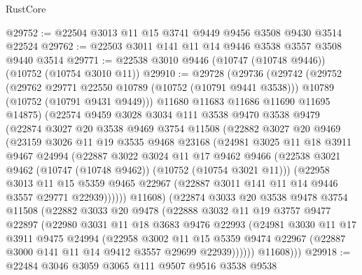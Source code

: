 \begin{lexlean}{RustCore}
\begin{coremodule}
@29752 := @22504 @3013 @11 @15 @3741 @9449 @9456 @3508 @9430 @3514 @22524
@29762 := @22503 @3011 @141 @11 @14 @9446 @3538 @3557 @3508 @9440 @3514
@29771 := @22538 @3010 @9446 (@10747 (@10748 @9446)) (@10752 (@10754 @3010 @11))
@29910 := @29728
    (@29736
      (@29742
        (@29752
          (@29762 @29771 @22550 @10789 (@10752 (@10791 @9441 @3538)))
          @10789
          (@10752 (@10791 @9431 @9449)))
        @11680
        @11683
        @11686
        @11690
        @11695
        @14875)
      (@22574
        @9459
        @3028
        @3034
        @111
        @3538
        @9470
        @3538
        @9479
        (@22874
          @3027
          @20
          @3538
          @9469
          @3754
          @11508
          (@22882
            @3027
            @20
            @9469
            (@23159
              @3026
              @11
              @19
              @3535
              @9468
              @23168
              (@24981
                @3025
                @11
                @18
                @3911
                @9467
                @24994
                (@22887
                  @3022
                  @3024
                  @11
                  @17
                  @9462
                  @9466
                  (@22538 @3021 @9462 (@10747 (@10748 @9462)) (@10752 (@10754 @3021 @11)))
                  (@22958
                    @3013
                    @11
                    @15
                    @5359
                    @9465
                    @22967
                    (@22887 @3011 @141 @11 @14 @9446 @3557 @29771 @22939))))))
          @11608)
        (@22874
          @3033
          @20
          @3538
          @9478
          @3754
          @11508
          (@22882
            @3033
            @20
            @9478
            (@22888
              @3032
              @11
              @19
              @3757
              @9477
              @22897
              (@22980
                @3031
                @11
                @18
                @3683
                @9476
                @22993
                (@24981
                  @3030
                  @11
                  @17
                  @3911
                  @9475
                  @24994
                  (@22958
                    @3002
                    @11
                    @15
                    @5359
                    @9474
                    @22967
                    (@22887 @3000 @141 @11 @14 @9412 @3557 @29699 @22939))))))
          @11608)))
@29918 := @22484 @3046 @3059 @3065 @111 @9507 @9516 @3538 @9538

\end{coremodule}
\end{lexlean}
